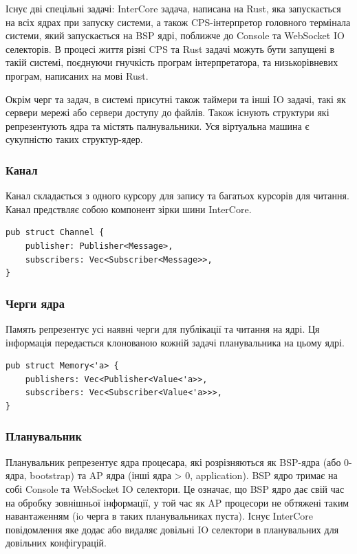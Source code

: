 Існує дві спецільні задачі: InterCore задача, написана на Rust,
яка запускається на всіх ядрах при запуску системи, а також CPS-інтерпретор
головного термінала системи, який запускається на BSP ядрі, поближче до Console та WebSocket IO селекторів.
В процесі життя різні CPS та Rust задачі можуть бути запущені в такій системі,
поєднуючи гнучкість програм інтерпретатора, та низькорівневих програм, написаних на мові Rust.

Окрім черг та задач, в системі присутні також таймери та інші IO задачі,
такі як сервери мережі або сервери доступу до файлів. Також існують
структури які репрезентують ядра та містять палнувальники.
Уся віртуальна машина є сукупністю таких структур-ядер.

\subsubsection{Канал}
Канал складається з одного курсору для запису та багатьох курсорів для читання.
Канал предствляє собою компонент зірки шини InterCore.
\begin{lstlisting}
pub struct Channel {
    publisher: Publisher<Message>,
    subscribers: Vec<Subscriber<Message>>,
}
\end{lstlisting}

\subsubsection{Черги ядра}
Память репрезентує усі наявні черги для публікації та читання на ядрі.
Ця інформація передається клонованою кожній задачі планувальника на цьому ядрі.
\begin{lstlisting}
pub struct Memory<'a> {
    publishers: Vec<Publisher<Value<'a>>,
    subscribers: Vec<Subscriber<Value<'a>>>,
}
\end{lstlisting}

\subsubsection{Планувальник}
Планувальник репрезентує ядра процесара,
які розрізняються як BSP-ядра (або 0-ядра, bootstrap)
та AP ядра (інші ядра > 0, application). BSP ядро
тримає на собі Console та WebSocket IO селектори.
Це означає, що BSP ядро дає свій час на обробку зовнішньої інформації,
у той час як AP процесори не обтяжені
таким навантаженням (io черга в таких планувальниках пуста).
Існує InterCore повідомлення яке додає або видаляє довільні IO селектори
в планувальних для довільних конфігурацій.

